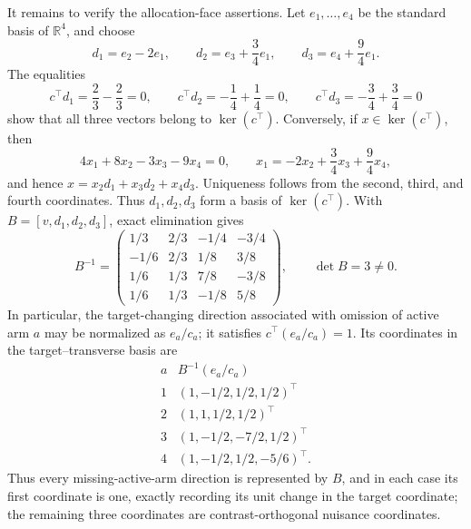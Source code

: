 It remains to verify the allocation-face assertions.  Let \(e_1,\ldots,e_4\) be the standard basis of \(\mathbb R^4\), and choose
\[
 d_1=e_2-2e_1,\qquad
 d_2=e_3+\frac34e_1,\qquad
 d_3=e_4+\frac94e_1.
\]
The equalities
\[
 c^\top d_1=\frac23-\frac23=0,
 \qquad
 c^\top d_2=-\frac14+\frac14=0,
 \qquad
 c^\top d_3=-\frac34+\frac34=0
\]
show that all three vectors belong to \(\ker(c^\top)\).  Conversely, if \(x\in\ker(c^\top)\), then
\[
 4x_1+8x_2-3x_3-9x_4=0,
 \qquad
 x_1=-2x_2+\frac34x_3+\frac94x_4,
\]
and hence \(x=x_2d_1+x_3d_2+x_4d_3\).  Uniqueness follows from the second, third, and fourth coordinates.  Thus \(d_1,d_2,d_3\) form a basis of \(\ker(c^\top)\).  With \(B=[v,d_1,d_2,d_3]\), exact elimination gives
\[
 B^{-1}=
 \begin{pmatrix}
 1/3&2/3&-1/4&-3/4\\
 -1/6&2/3&1/8&3/8\\
 1/6&1/3&7/8&-3/8\\
 1/6&1/3&-1/8&5/8
 \end{pmatrix},
 \qquad \det B=3\ne0.
\]
In particular, the target-changing direction associated with omission of active arm \(a\) may be normalized as \(e_a/c_a\); it satisfies \(c^\top(e_a/c_a)=1\).  Its coordinates in the target--transverse basis are
\[
\begin{array}{c|c}
a&B^{-1}(e_a/c_a)\\ \hline
1&(1,-1/2,1/2,1/2)^\top\\
2&(1,1,1/2,1/2)^\top\\
3&(1,-1/2,-7/2,1/2)^\top\\
4&(1,-1/2,1/2,-5/6)^\top.
\end{array}
\]
Thus every missing-active-arm direction is represented by \(B\), and in each case its first coordinate is one, exactly recording its unit change in the target coordinate; the remaining three coordinates are contrast-orthogonal nuisance coordinates.

